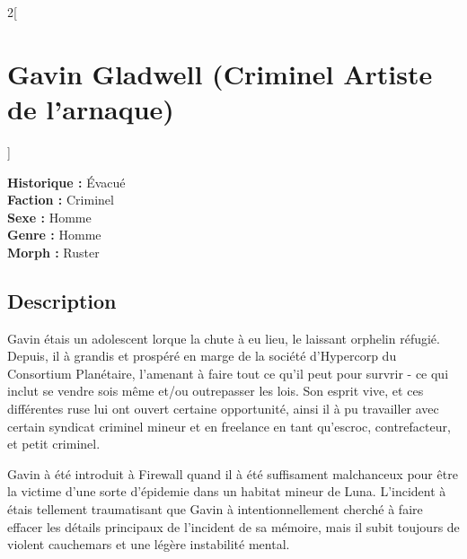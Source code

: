 \documentclass[a4paper,9pt]{article}
\begin{document}
\begin{multicols}{2}[\section*{Gavin Gladwell (Criminel Artiste de l'arnaque)}]
   
   \noindent\textbf{Historique :} Évacué\\
   \noindent\textbf{Faction :} Criminel\\
   \noindent\textbf{Sexe :} Homme\\
   \noindent\textbf{Genre :} Homme\\
   \noindent\textbf{Morph :} Ruster\\

   \subsection*{Description}

   Gavin étais un adolescent lorque la chute à eu lieu, le laissant orphelin réfugié.
   Depuis, il à grandis et prospéré en marge de la société d'Hypercorp du
   Consortium Planétaire, l'amenant à faire tout ce qu'il peut pour survrir - ce
   qui inclut se vendre sois même et/ou outrepasser les lois.
   Son esprit vive, et ces différentes ruse lui ont ouvert certaine opportunité,
   ainsi il à pu travailler avec certain syndicat criminel mineur et en freelance
   en tant qu'escroc, contrefacteur, et petit criminel.

   Gavin à été introduit à Firewall quand il à été suffisament malchanceux pour
   être la victime d'une sorte d'épidemie dans un habitat mineur de Luna.
   L'incident à étais tellement traumatisant que Gavin à intentionnellement
   cherché à faire effacer les détails principaux de l'incident de sa mémoire,
   mais il subit toujours de violent cauchemars et une légère instabilité mental.


\end{multicols}
\end{document}
